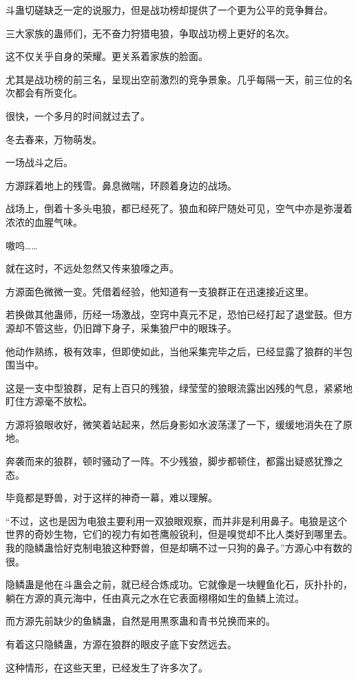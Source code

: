 \begin{this_body}
斗蛊切磋缺乏一定的说服力，但是战功榜却提供了一个更为公平的竞争舞台。

三大家族的蛊师们，无不奋力狩猎电狼，争取战功榜上更好的名次。

这不仅关乎自身的荣耀。更关系着家族的脸面。

尤其是战功榜的前三名，呈现出空前激烈的竞争景象。几乎每隔一天，前三位的名次都会有所变化。

很快，一个多月的时间就过去了。

冬去春来，万物萌发。

一场战斗之后。

方源踩着地上的残雪。鼻息微喘，环顾着身边的战场。

战场上，倒着十多头电狼，都已经死了。狼血和碎尸随处可见，空气中亦是弥漫着浓浓的血腥气味。

嗷呜……

就在这时，不远处忽然又传来狼嚎之声。

方源面色微微一变。凭借着经验，他知道有一支狼群正在迅速接近这里。

若换做其他蛊师，历经一场激战，空窍中真元不足，恐怕已经打起了退堂鼓。但方源却不管这些，仍旧蹲下身子，采集狼尸中的眼珠子。

他动作熟练，极有效率，但即使如此，当他采集完毕之后，已经显露了狼群的半包围当中。

这是一支中型狼群，足有上百只的残狼，绿莹莹的狼眼流露出凶残的气息，紧紧地盯住方源毫不放松。

方源将狼眼收好，微笑着站起来，然后身影如水波荡漾了一下，缓缓地消失在了原地。

奔袭而来的狼群，顿时骚动了一阵。不少残狼，脚步都顿住，都露出疑惑犹豫之态。

毕竟都是野兽，对于这样的神奇一幕，难以理解。

“不过，这也是因为电狼主要利用一双狼眼观察，而并非是利用鼻子。电狼是这个世界的奇妙生物，它们的视力有如苍鹰般锐利，但是嗅觉却不比人类好到哪里去。我的隐鳞蛊恰好克制电狼这种野兽，但是却瞒不过一只狗的鼻子。”方源心中有数的很。

隐鳞蛊是他在斗蛊会之前，就已经合炼成功。它就像是一块鲤鱼化石，灰扑扑的，躺在方源的真元海中，任由真元之水在它表面栩栩如生的鱼鳞上流过。

而方源先前缺少的鱼鳞蛊，自然是用黒豕蛊和青书兑换而来的。

有着这只隐鳞蛊，方源在狼群的眼皮子底下安然远去。

这种情形，在这些天里，已经发生了许多次了。


\end{this_body}
